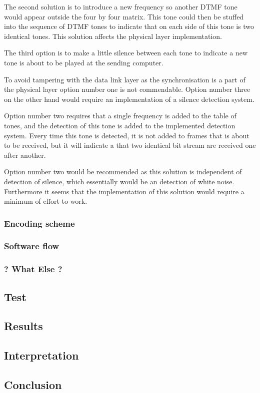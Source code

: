 		The second solution is to introduce a new frequency so another DTMF tone would appear outside the four by four matrix.
		This tone could then be stuffed into the sequence of DTMF tones to indicate that on each side of this tone is two identical
		tones. This solution affects the physical layer implementation.
		
		The third option is to make a little silence between each tone to indicate a new tone is about to be played at the sending computer.
		
		To avoid tampering with the data link layer as the synchronisation is a part of the physical layer option number one is not commendable. Option
		number three on the other hand would require an implementation of a silence detection system.
		
		Option number two requires that a single frequency is added to the table of tones, and the detection of this tone is added to the implemented
		detection system. Every time this tone is detected, it is not added to frames that is about to be received, but it will indicate a that two
		identical bit stream are received one after another.
		
		Option number two would be recommended as this solution is independent of detection of silence, which essentially would be an detection of
		white noise. Furthermore it seems that the implementation of this solution would require a minimum of effort to work.		
		
		\subsubsection{Encoding scheme}
		
		
		\subsubsection{Software flow}
				
		\subsubsection{? What Else ?}
		
	\subsection{Test}
	
	\subsection{Results}
	
	\subsection{Interpretation}
	
	\subsection{Conclusion}